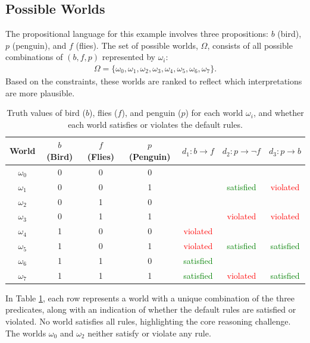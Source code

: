 \documentclass[seminar,english,m]{AIGpaper}
\begin{document}
\subsection{Possible Worlds}
The propositional language for this example involves three propositions: \( b \) (bird), \( p \) (penguin), and \( f \) (flies). The set of possible worlds, \( \Omega \), consists of all possible combinations of \( (b, f, p) \) represented by \( \omega_i \):
\begin{align*}
	\Omega = \{ \omega_0, \omega_1, \omega_2, \omega_3, \omega_4, \omega_5, \omega_6, \omega_7 \}.
\end{align*}  
Based on the constraints, these worlds are ranked to reflect which interpretations are more plausible.\\
\begin{table}[h]
	\centering
	\begin{tabular}{c||c|c|c||c|c|c}
		World & \( b \) (Bird) & \( f \) (Flies) & \( p \) (Penguin) & \( d_1: b \to f \) & \( d_2: p \to \neg f \) & \( d_3: p \to b \) \\
		\hline
		\( \omega_0 \) & 0 & 0 & 0 &  &  &  \\
		\( \omega_1 \) & 0 & 0 & 1 &  & \textcolor{green}{satisfied} & \textcolor{red}{violated} \\
		\( \omega_2 \) & 0 & 1 & 0 &  &  &  \\
		\( \omega_3 \) & 0 & 1 & 1 &  & \textcolor{red}{violated} & \textcolor{red}{violated} \\
		\( \omega_4 \) & 1 & 0 & 0 & \textcolor{red}{violated} &  &  \\
		\( \omega_5 \) & 1 & 0 & 1 & \textcolor{red}{violated} & \textcolor{green}{satisfied} & \textcolor{green}{satisfied} \\
		\( \omega_6 \) & 1 & 1 & 0 & \textcolor{green}{satisfied} &  &  \\
		\( \omega_7 \) & 1 & 1 & 1 & \textcolor{green}{satisfied} & \textcolor{red}{violated} & \textcolor{green}{satisfied} \\
	\end{tabular}
	\caption{Truth values of bird (\( b \)), flies (\( f \)), and penguin (\( p \)) for each world \( \omega_i \), and whether each world satisfies or violates the default rules.}
	\label{tab:worlds_rules}
\end{table}
In Table \ref{tab:worlds_rules}, each row represents a world with a unique combination of the three predicates, along with an indication of whether the default rules are satisfied or violated. No world satisfies all rules, highlighting the core reasoning challenge. The worlds \( \omega_0 \) and \( \omega_2 \) neither satisfy or violate any rule.  
\end{document}
